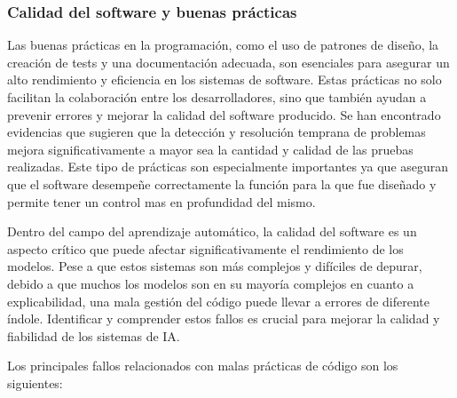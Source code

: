 \subsubsection{Calidad del software y buenas prácticas}
Las buenas prácticas en la programación, como el uso de patrones de diseño, la 
creación de tests y una documentación adecuada, son esenciales para asegurar un 
alto rendimiento y eficiencia en los sistemas de software. Estas prácticas no solo facilitan 
la colaboración entre los desarrolladores, sino que también ayudan a prevenir errores y 
mejorar la calidad del software producido. Se han encontrado evidencias \cite{Athanasiou2014Test} 
que sugieren que la detección y resolución temprana de problemas mejora significativamente a mayor sea la
cantidad y calidad de las pruebas realizadas. Este tipo de prácticas son especialmente importantes
ya que aseguran que el software desempeñe correctamente la función para la que fue diseñado y
permite tener un control mas en profundidad del mismo.\medskip

Dentro del campo del aprendizaje automático, la calidad del software es un aspecto crítico 
que puede afectar significativamente el rendimiento de los modelos. Pese a que estos sistemas
son más complejos y difíciles de depurar, debido a que muchos los modelos son en su mayoría
complejos en cuanto a explicabilidad, una mala gestión del código puede llevar a errores
de diferente índole. Identificar y comprender estos fallos es crucial para mejorar la calidad y fiabilidad de 
los sistemas de IA.\medskip

Los principales fallos relacionados con malas prácticas de código son los siguientes:

